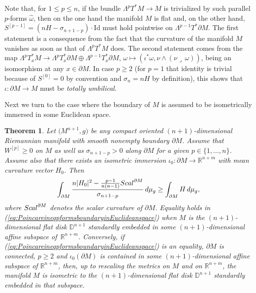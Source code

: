 \documentclass[11pt]{article}
\numberwithin{equation}{section}
\numberwithin{equation}{section}
\newtheorem{Theorem}{Theorem}[section]
\begin{document}
\begin{Remark}\label{r:LambdapTMtrivial} Note that, for $1\leq p\leq n$, if the bundle $\Lambda^p T^*M\to M$ is trivialized by such parallel $p$-forms $\hat{\omega}$, then on the one hand the manifold $M$ is flat and, on the other hand, $S^{[p-1]}=(nH-\sigma_{n+1-p})\cdot\mathrm{Id}$ must hold pointwise on $\Lambda^{p-1}T^*\partial M$.
The first statement is a consequence from the fact that the curvature of the manifold $M$ vanishes as soon as that of $\Lambda^p T^*M$ does.
The second statement comes from the map $\Lambda^p T_x^*M\to \Lambda^p T^*_x\partial M\oplus \Lambda^{p-1} T^*_x\partial M$, $\omega\mapsto (\iota^*\omega,\nu\wedge(\nu\lrcorner\,\omega))$, being an isomorphism at any $x\in \partial M$.  In case $p\geq2$ (for $p=1$ that identity is trivial because of $S^{[0]}=0$ by convention and $\sigma_{n}=nH$ by definition), this shows that $\iota\colon\partial M\to M$ must be \emph{totally umbilical}.
\end{Remark}

Next we turn to the case where the boundary of $M$ is assumed to be isometrically immersed in some Euclidean space.

\begin{Theorem}\label{t:PoincareineqpformsboundaryinEuclideanspace}
Let $\bigl(M^{n+1},g\bigr)$ be any compact oriented $(n+1)$-dimensional Riemannian manifold with smooth nonempty boundary $\partial M$.
Assume that $W^{[p]}\geq0$ on $M$ as well as $\sigma_{n+1-p}>0$ along $\partial M$ for a given $p\in\{1,\dots,n\}$.
Assume also that there exists an isometric immersion $\iota_0\colon\partial M\to\mathbb{R}^{n+m}$ with mean curvature vector $H_0$. Then
\begin{equation}\label{eq:PoincareineqpformsboundaryinEuclideanspace}
\int_{\partial M}\frac{n|H_0|^2-\frac{p-1}{n(n-1)}{\rm Scal}^{\partial M}}{\sigma_{n+1-p}}\,{\rm d}\mu_g\geq\int_{\partial M}H\,{\rm d}\mu_g,
\end{equation}
where  ${\rm Scal}^{\partial M}$  denotes the scalar curvature of $\partial M$. Equality holds in {\rm (\ref{eq:PoincareineqpformsboundaryinEuclideanspace})} when $M$ is the $(n+1)$-dimensional flat disk $\mathbb{D}^{n+1}$ standardly embedded in some $(n+1)$-dimensional affine subspace of~$\mathbb{R}^{n+m}$. Conversely, if {\rm (\ref{eq:PoincareineqpformsboundaryinEuclideanspace})} is an equality, $\partial M$ is connected, $p\geq 2$ and $\iota_0(\partial M)$ is contained in some $(n+1)$-dimensional affine subspace of $\mathbb{R}^{n+m}$, then, up to rescaling the metrics on $M$ and on $\mathbb{R}^{n+m}$, the manifold $M$ is isometric to the $(n+1)$-dimensional flat disk $\mathbb{D}^{n+1}$ standardly embedded in that subspace.
\end{Theorem}
\end{document}
